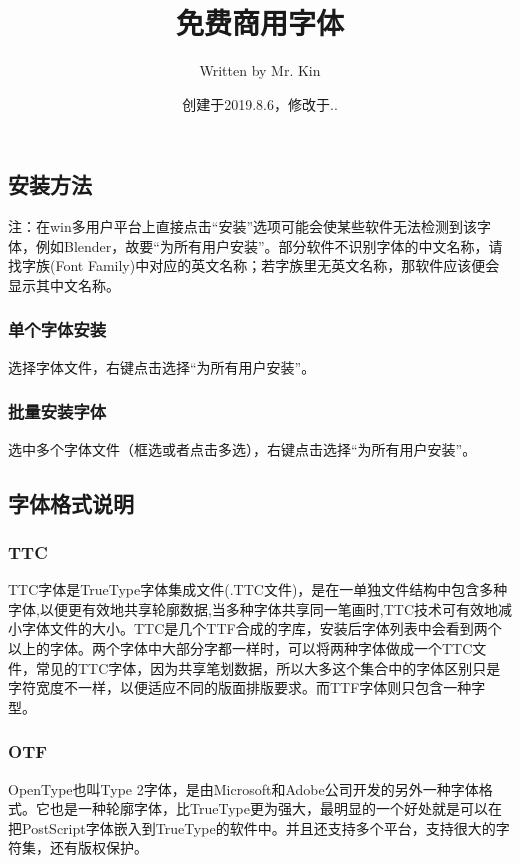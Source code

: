 \documentclass[11pt,a4paper,UTF8,titlepage]{ctexart} %
\title{\hypertarget{title}{\textbf{免费商用字体}}}
\author{Written by Mr. Kin}
\date{创建于2019.8.6，修改于\number\year.\number\month.\number\day}
\makeatletter
\renewcommand{\tableofcontents}%
  {\chapter{\contentsname}%
  \@mkboth{\MakeUppercase\contentsname}{\MakeUppercase\contentsname}%
  \@makeschapterhead{\sourcecodename}%
  \@starttoc{toc}%
}
\makeatother
\begin{document}
    \maketitle %
    {\centering \tableofcontents} %
    \clearpage %

    \section{安装方法}
    注：在win多用户平台上直接点击“安装”选项可能会使某些软件无法检测到该字体，例如Blender，故要“为所有用户安装”。部分软件不识别字体的中文名称，请找字族(Font Family)中对应的英文名称；若字族里无英文名称，那软件应该便会显示其中文名称。
    \subsection{单个字体安装}
    选择字体文件，右键点击选择“为所有用户安装”。
    \subsection{批量安装字体}
    选中多个字体文件（框选或者点击多选），右键点击选择“为所有用户安装”。

    \section{字体格式说明}
    \subsection{TTC}
    TTC字体是TrueType字体集成文件(.TTC文件)，是在一单独文件结构中包含多种字体,以便更有效地共享轮廓数据,当多种字体共享同一笔画时,TTC技术可有效地减小字体文件的大小。TTC是几个TTF合成的字库，安装后字体列表中会看到两个以上的字体。两个字体中大部分字都一样时，可以将两种字体做成一个TTC文件，常见的TTC字体，因为共享笔划数据，所以大多这个集合中的字体区别只是字符宽度不一样，以便适应不同的版面排版要求。而TTF字体则只包含一种字型。

    \subsection{OTF}
    OpenType也叫Type 2字体，是由Microsoft和Adobe公司开发的另外一种字体格式。它也是一种轮廓字体，比TrueType更为强大，最明显的一个好处就是可以在把PostScript字体嵌入到TrueType的软件中。并且还支持多个平台，支持很大的字符集，还有版权保护。
\end{document}
